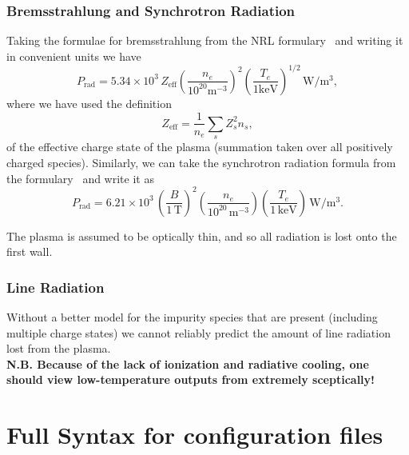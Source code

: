 \documentclass{revtex4}
\begin{document}
\subsubsection{Bremsstrahlung and Synchrotron Radiation}
Taking the formulae for bremsstrahlung from the NRL formulary~\cite{nrlformulary} and writing it in convenient units we have
\begin{equation}
P_{\mathrm{rad}} =  5.34 \times 10^3\, Z_{\mathrm{eff}} \left(\frac{n_e}{10^{20} \mathrm{m}^{-3}}\right)^2 \left(\frac{T_e}{1 \mathrm{keV}}\right)^{1/2}\, \mathrm{W}/\mathrm{m}^3,
\end{equation}
where we have used the definition
\begin{equation}
Z_{\mathrm{eff}} = \frac{1}{n_e} \sum_{s} Z_s^2 n_s,
\end{equation}
of the effective charge state of the plasma (summation taken over all positively charged species).
Similarly, we can take the synchrotron radiation formula from the formulary~\cite{nrlformulary} and write it as
\begin{equation}
P_{\mathrm{rad}} =  6.21 \times 10^3 \,\left( \frac{B}{1\,\mathrm{T}} \right)^2 \left( \frac{n_e}{10^{20}\, \mathrm{m}^{-3}} \right) \left( \frac{T_e}{1\,\mathrm{keV}} \right)\, \mathrm{W}/\mathrm{m}^3.
\end{equation}

The plasma is assumed to be optically thin, and so all radiation is lost onto the first wall.

\subsubsection{Line Radiation}
 Without a better model for the impurity species that are present (including multiple charge states) we cannot reliably predict the amount of line radiation lost from the plasma.
\\
\textbf{N.B. Because of the lack of ionization and radiative cooling, one should view low-temperature outputs from \mctrans{} extremely sceptically!}


\appendix
\section{Full Syntax for \mctrans{} configuration files}


\end{document}
